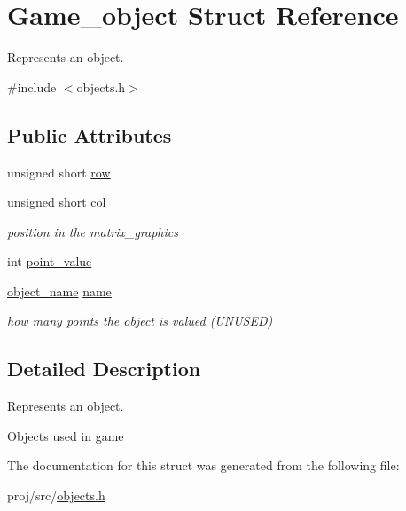 \hypertarget{structGame__object}{}\section{Game\+\_\+object Struct Reference}
\label{structGame__object}


Represents an object.  




{\ttfamily \#include $<$objects.\+h$>$}

\subsection*{Public Attributes}
\begin{DoxyCompactItemize}
\item 
unsigned short \hyperlink{group__object_ga41a0b70059db5a8364cb00caed5f7860}{row}
\item 
unsigned short \hyperlink{group__object_ga26747c58af9aac0a386f3be5b5302d23}{col}
\begin{DoxyCompactList}\small\item\em position in the matrix\+\_\+graphics \end{DoxyCompactList}\item 
int \hyperlink{group__object_gaa3e8af9c364161ddf47359bba651e9cf}{point\+\_\+value}
\item 
\hyperlink{group__object_ga90ab20efa1890ce46e743d7569ce7cec}{object\+\_\+name} \hyperlink{group__object_ga27d8ddc2e36ab28af25f9698f1b11e49}{name}
\begin{DoxyCompactList}\small\item\em how many points the object is valued (U\+N\+U\+S\+ED) \end{DoxyCompactList}\end{DoxyCompactItemize}


\subsection{Detailed Description}
Represents an object. 

Objects used in game 

The documentation for this struct was generated from the following file\+:\begin{DoxyCompactItemize}
\item 
proj/src/\hyperlink{objects_8h}{objects.\+h}\end{DoxyCompactItemize}

